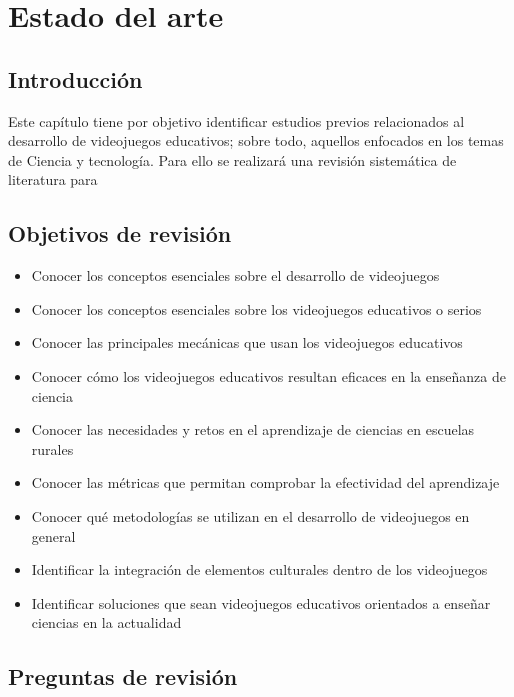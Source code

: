 \renewcommand{\baselinestretch}{1.5}
\onehalfspacing
{}

\chapter{Estado del arte}

\section{Introducción}

Este capítulo tiene por objetivo identificar estudios previos relacionados al desarrollo de videojuegos educativos; sobre todo, aquellos enfocados en los temas de Ciencia y tecnología. Para ello se realizará una revisión sistemática de literatura para 

\section{Objetivos de revisión}

\begin{itemize}
    \item Conocer los conceptos esenciales sobre el desarrollo de videojuegos
    \item Conocer los conceptos esenciales sobre los videojuegos educativos o serios
    \item Conocer las principales mecánicas que usan los videojuegos educativos
    \item Conocer cómo los videojuegos educativos resultan eficaces en la enseñanza de ciencia
    \item Conocer las necesidades y retos en el aprendizaje de ciencias en escuelas rurales
    \item Conocer las métricas que permitan comprobar la efectividad del aprendizaje
    \item Conocer qué metodologías se utilizan en el desarrollo de videojuegos en general
    \item Identificar la integración de elementos culturales dentro de los videojuegos
    \item Identificar soluciones que sean videojuegos educativos orientados a enseñar ciencias en la actualidad
\end{itemize}

\section{Preguntas de revisión}

